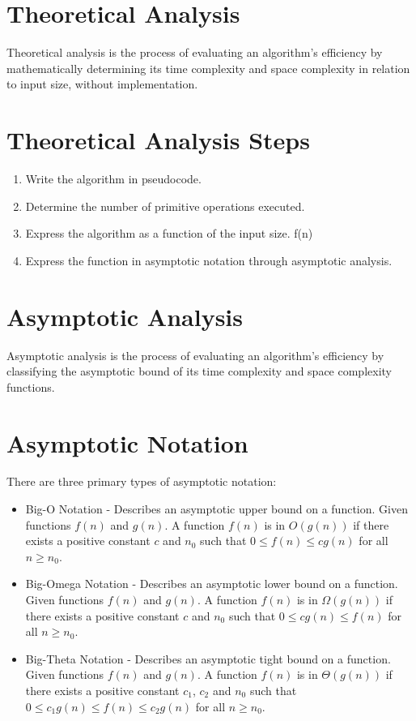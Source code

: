 \documentclass{book}
\begin{document}
\section{Theoretical Analysis}

Theoretical analysis is the process of evaluating an algorithm's efficiency by mathematically determining its time complexity and space complexity in relation to input size, without implementation.

\section{Theoretical Analysis Steps}

\begin{enumerate}
  \item Write the algorithm in pseudocode.
  \item Determine the number of primitive operations executed.
  \item Express the algorithm as a function of the input size. f(n)
  \item Express the function in asymptotic notation through asymptotic analysis.
\end{enumerate}

\section{Asymptotic Analysis}

Asymptotic analysis is the process of evaluating an algorithm's efficiency by classifying the asymptotic bound of its time complexity and space complexity functions.

\section{Asymptotic Notation}

There are three primary types of asymptotic notation:

\begin{itemize}
  \item Big-O Notation - Describes an asymptotic upper bound on a function.
    Given functions $f(n)$ and $g(n)$. A function $f(n)$ is in $O(g(n))$ if there exists a positive constant $c$ and $n_0$ such that $0 \le f(n) \le cg(n)$ for all $n \ge n_0$.
  \item Big-Omega Notation - Describes an asymptotic lower bound on a function.
    Given functions $f(n)$ and $g(n)$. A function $f(n)$ is in $\Omega(g(n))$ if there exists a positive constant $c$ and $n_0$ such that $0 \le cg(n) \le f(n)$ for all $n \ge n_0$.
  \item Big-Theta Notation - Describes an asymptotic tight bound on a function.
    Given functions $f(n)$ and $g(n)$. A function $f(n)$ is in $\Theta(g(n))$ if there exists a positive constant $c_1$, $c_2$ and $n_0$ such that $0 \le c_{1}g(n) \le f(n) \le c_{2}g(n)$ for all $n \ge n_0$.
\end{itemize}
\end{document}
